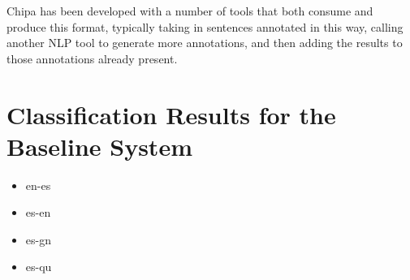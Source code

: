 Chipa has been developed with a number of tools that both consume and produce
this format, typically taking in sentences annotated in this way, calling
another NLP tool to generate more annotations, and then adding the results to
those annotations already present.

\section{Classification Results for the Baseline System}


\begin{itemize}
\item en-es
\item es-en
\item es-gn
\item es-qu
\end{itemize}

